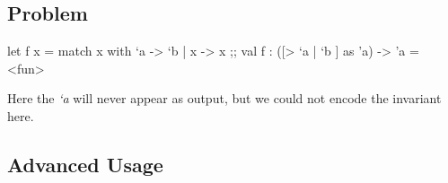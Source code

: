 \inputminted[fontsize=\scriptsize]{ocaml}{code/types/test_poly_coer.ml}

\subsection{Problem}

\begin{ocamlcode}
let f x = match x  with `a -> `b | x -> x ;;
val f : ([> `a | `b ] as 'a) -> 'a = <fun>
\end{ocamlcode}

Here the \textit{`a} will never appear as output, but we could not
encode the invariant here.


\subsection{Advanced Usage}
\label{sec:advanced-usage}


